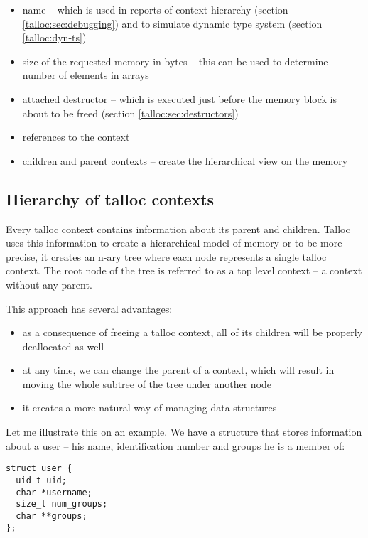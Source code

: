 \begin{itemize}
  \item name -- which is used in reports of context hierarchy (section
  \ref{talloc:sec:debugging}) and to simulate dynamic type system (section
  \ref{talloc:dyn-ts})
  \item size of the requested memory in bytes -- this can be used to determine
  number of elements in arrays
  \item attached destructor -- which is executed just before the memory block is
  about to be freed (section \ref{talloc:sec:destructors})
  \item references to the context
  \item children and parent contexts -- create the hierarchical view on the
  memory
\end{itemize}

\subsection{Hierarchy of talloc contexts}

Every talloc context contains information about its parent and children. Talloc
uses this information to create a hierarchical model of memory or to be more
precise, it creates an n-ary tree where each node represents a single talloc
context. The root node of the tree is referred to as a top level context -- a
context without any parent.

This approach has several advantages:

\begin{itemize}
  \item as a consequence of freeing a talloc context, all of its children
  will be properly deallocated as well
  \item at any time, we can change the parent of a context, which
  will result in moving the whole subtree of the tree under another node
  \item it creates a more natural way of managing data structures
\end{itemize}

Let me illustrate this on an example. We have a structure that stores
information about a user -- his name, identification number and groups he is a
member of:

\begin{lstlisting}[caption={struct user},label={struct-user}]
struct user {
  uid_t uid;
  char *username;
  size_t num_groups;
  char **groups;
};
\end{lstlisting}

